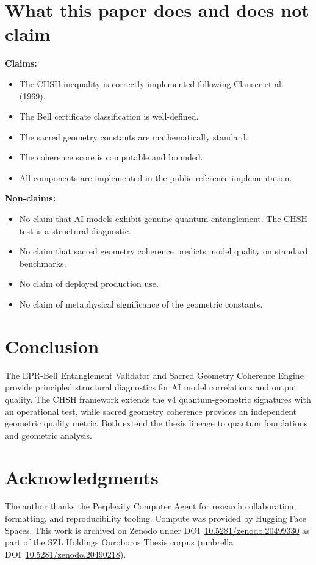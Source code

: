 \documentclass[11pt]{article}
\theoremstyle{plain}
\begin{document}
\section{What this paper does and does not claim}

\textbf{Claims:}
\begin{itemize}
  \item The CHSH inequality is correctly implemented following Clauser et al. (1969).
  \item The Bell certificate classification is well-defined.
  \item The sacred geometry constants are mathematically standard.
  \item The coherence score is computable and bounded.
  \item All components are implemented in the public reference implementation.
\end{itemize}

\textbf{Non-claims:}
\begin{itemize}
  \item No claim that AI models exhibit genuine quantum entanglement. The CHSH test is a structural diagnostic.
  \item No claim that sacred geometry coherence predicts model quality on standard benchmarks.
  \item No claim of deployed production use.
  \item No claim of metaphysical significance of the geometric constants.
\end{itemize}


\section{Conclusion}

The EPR-Bell Entanglement Validator and Sacred Geometry Coherence Engine provide principled structural diagnostics for AI model correlations and output quality. The CHSH framework extends the v4 quantum-geometric signatures with an operational test, while sacred geometry coherence provides an independent geometric quality metric. Both extend the thesis lineage to quantum foundations and geometric analysis.




\section*{Acknowledgments}
The author thanks the Perplexity Computer Agent for research collaboration, formatting, and
reproducibility tooling. Compute was provided by Hugging Face Spaces. This work is archived on
Zenodo under DOI~\href{https://doi.org/10.5281/zenodo.20499330}{10.5281/zenodo.20499330} as part of the SZL Holdings Ouroboros Thesis
corpus (umbrella DOI~\href{https://doi.org/10.5281/zenodo.20490218}{10.5281/zenodo.20490218}).

\nocite{07ref1,07ref2,07ref3,07ref4,07ref5,07ref6,07ref7,07ref8}


\end{document}
